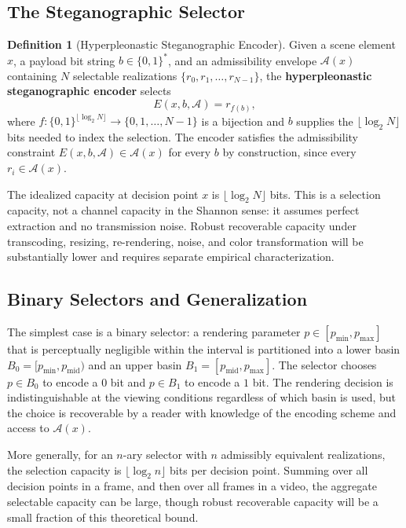 \documentclass[11pt,a4paper]{article}
\theoremstyle{plain}
\theoremstyle{definition}
\newtheorem{definition}[theorem]{Definition}
\theoremstyle{remark}
\begin{document}
\subsection{The Steganographic Selector}

\begin{definition}[Hyperpleonastic Steganographic Encoder]
\label{def:steg}
Given a scene element $x$, a payload bit string $b \in \{0,1\}^*$, and an admissibility envelope $\mathcal{A}(x)$ containing $N$ selectable realizations $\{r_0, r_1, \ldots, r_{N-1}\}$, the \textbf{hyperpleonastic steganographic encoder} selects
\[
E(x, b, \mathcal{A}) = r_{f(b)},
\]
where $f : \{0,1\}^{\lfloor \log_2 N \rfloor} \to \{0, 1, \ldots, N-1\}$ is a bijection and $b$ supplies the $\lfloor \log_2 N \rfloor$ bits needed to index the selection. The encoder satisfies the admissibility constraint $E(x, b, \mathcal{A}) \in \mathcal{A}(x)$ for every $b$ by construction, since every $r_i \in \mathcal{A}(x)$.
\end{definition}

The idealized capacity at decision point $x$ is $\lfloor \log_2 N \rfloor$ bits. This is a selection capacity, not a channel capacity in the Shannon sense: it assumes perfect extraction and no transmission noise. Robust recoverable capacity under transcoding, resizing, re-rendering, noise, and color transformation will be substantially lower and requires separate empirical characterization.

\subsection{Binary Selectors and Generalization}

The simplest case is a binary selector: a rendering parameter $p \in [p_{\min}, p_{\max}]$ that is perceptually negligible within the interval is partitioned into a lower basin $B_0 = [p_{\min}, p_{\mathrm{mid}})$ and an upper basin $B_1 = [p_{\mathrm{mid}}, p_{\max}]$. The selector chooses $p \in B_0$ to encode a $0$ bit and $p \in B_1$ to encode a $1$ bit. The rendering decision is indistinguishable at the viewing conditions regardless of which basin is used, but the choice is recoverable by a reader with knowledge of the encoding scheme and access to $\mathcal{A}(x)$.

More generally, for an $n$-ary selector with $n$ admissibly equivalent realizations, the selection capacity is $\lfloor \log_2 n \rfloor$ bits per decision point. Summing over all decision points in a frame, and then over all frames in a video, the aggregate selectable capacity can be large, though robust recoverable capacity will be a small fraction of this theoretical bound.
\end{document}
